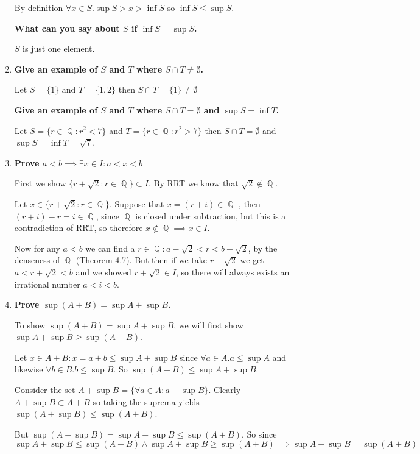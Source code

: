 \documentclass[10pt,a4paper]{article}
\DeclareMathOperator*{\Q}{\mathbb{Q}}
\begin{document}
\begin{enumerate}
        By definition $\forall x \in S. \sup S > x > \inf S$ so $\inf S \leq \sup S$.

        \textbf{What can you say about $S$ if $\inf S = \sup S$.}
        
        $S$ is just one element.

    \item \textbf{Give an example of $S$ and $T$ where $S \cap T \neq \emptyset$.} 
        
        Let $S = \{ 1 \} $ and $T = \{1, 2\}$ then $S \cap T = \{ 1 \} \neq \emptyset$

        \textbf{Give an example of $S$ and $T$ where $S \cap T = \emptyset$ and $\sup S = \inf T$.} 

        Let $S = \{ r \in \Q : r^2 < 7 \} $ and $T = \{ r \in \Q : r^2 > 7 \}$ then $S \cap T = \emptyset$ and $\sup S = \inf T = \sqrt7$.

    \item \textbf{Prove $a<b \implies \exists x \in I: a<x<b$}

        First we show $\{ r + \sqrt2 : r \in \Q\} \subset I$. By RRT we know that $\sqrt2 \not\in \Q$.

        Let $x \in \{ r + \sqrt2 : r \in \Q\}$. Suppose that $x = (r+i) \in \Q$ , then $(r+i) - r = i \in \Q$, since $\Q$ is closed under subtraction, but this is a contradiction of RRT, so therefore $x \not\in \Q \implies x \in I$.

        Now for any $a < b$ we can find a $r \in \Q : a - \sqrt2 < r < b - \sqrt2$, by the denseness of $\Q$ (Theorem 4.7). 
        But then if we take $r + \sqrt2$ we get $a < r+\sqrt2 < b$ and we showed $r+\sqrt2 \in I$, so there will always exists an irrational number $a < i < b$.

    \item \textbf{Prove $\sup(A+B) = \sup A + \sup B $.}

        To show $\sup(A+B) = \sup A + \sup B $, we will first show $\sup A + \sup B \geq\sup(A+B)$.

        Let $x \in A+B : x =a+b  \leq \sup A  + \sup B$ since $\forall a \in A. a \leq \sup A$ and likewise $\forall b \in B. b \leq \sup B$.  So $\sup (A+B) \leq \sup A +  \sup B$.

        Consider the set $A+\sup B = \{\forall a \in A: a+\sup B\}$. Clearly $A + \sup B \subset A+B $ so taking the suprema yields $\sup(A+\sup B)\leq \sup(A+B)$. 

        But $\sup(A + \sup B) = \sup A + \sup B \leq \sup(A+B)$. So since 
        $$\sup A + \sup B \leq \sup(A+B) \land \sup A + \sup B \geq \sup(A+B) \implies \sup A + \sup B = \sup(A+B)$$


\end{enumerate}
\end{document}
